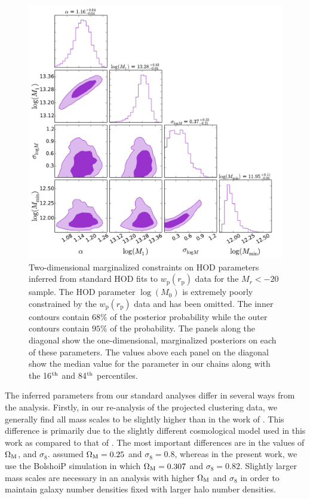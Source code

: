 \documentclass[usenatbib,usegraphicx,letterpaper]{mn2e}
\newcommand{\wprp}{w_{\mathrm{p}}}
\newcommand{\rp}{r_{\mathrm{p}}}
\begin{document}
\begin{figure}
\begin{center}
\includegraphics[width=15.0cm]{Mr20_covar_triangle_1.pdf}
\caption{
Two-dimensional marginalized constraints on HOD parameters inferred from
standard HOD fits to $\wprp(\rp)$ data for the $M_r<-20$ sample. The HOD parameter
$\log (M_0)$ is extremely poorly constrained by the $\wprp(\rp)$ data and has been
omitted. The inner contours contain $68\%$ of the posterior probability while the
outer contours contain $95\%$ of the probability. The panels along the diagonal
show the one-dimensional, marginalized posteriors on each of these parameters.
The values above each panel on the diagonal show the
median value for the parameter in our chains along with the
16$^{\rm th}$ and 84$^{\rm th}$ percentiles.
}
\label{fig:Mr20triangle}
\end{center}
\end{figure}

The inferred parameters from our standard analyses differ in several ways from the \citet{zehavi_etal11}
analysis. Firstly, in our re-analysis of the projected clustering data, we generally find all mass scales to
be slightly higher than in the work of \citet{zehavi_etal11}. This difference is primarily due to the slightly
different cosmological model used in this work as compared to that of \citet{zehavi_etal11}.
The most important differences are in the values of $\Omega_{\rm M}$, and $\sigma_8$.
\citet{zehavi_etal11} assumed $\Omega_{\rm M}=0.25$ and $\sigma_8=0.8$,
whereas in the present work, we use the BolshoiP simulation in which $\Omega_{\rm M}=0.307$ and $\sigma_8=0.82$.
Slightly larger mass scales are necessary in an analysis with higher $\Omega_{\rm M}$ and $\sigma_8$ in order
to maintain galaxy number densities fixed with larger halo number densities.
\end{document}
